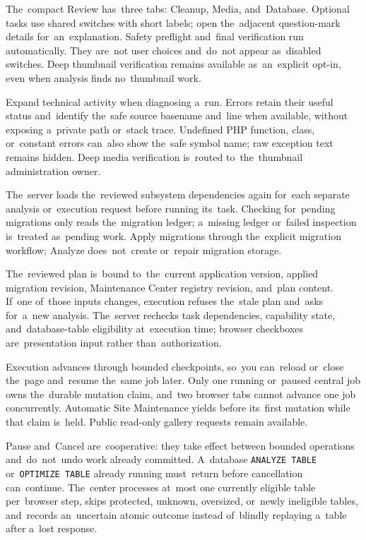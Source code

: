 \documentclass[11pt,a4paper]{article}
\newcommand{\codeword}[1]{\nolinkurl{#1}}
\begin{document}
The~compact Review has~three tabs: Cleanup, Media, and~Database. Optional tasks
use shared switches with short labels; open the~adjacent question-mark details
for~an~explanation. Safety preflight and~final verification run automatically.
They are~not user choices and~do~not appear as~disabled switches. Deep
thumbnail verification remains available as~an~explicit opt-in, even when
analysis finds no~thumbnail work.

Expand technical activity when diagnosing a~run. Errors retain their useful
status and~identify the~safe source basename and~line when available, without
exposing a~private path or~stack trace. Undefined PHP function, class,
or~constant
errors can~also show the~safe symbol name; raw exception text remains hidden.
Deep media verification is~routed to~the~thumbnail administration owner.

The~server loads the~reviewed subsystem dependencies again for~each separate
analysis or~execution request before running its~task. Checking for~pending
migrations only reads the~migration ledger; a~missing ledger or~failed
inspection is~treated as~pending work. Apply migrations through the~explicit
migration workflow; Analyze does~not~create or~repair migration storage.

The~reviewed plan is~bound to~the~current application version, applied migration
revision, Maintenance Center registry revision, and~plan content. If~one
of~those inputs changes, execution refuses the~stale plan and~asks for~a~new
analysis. The~server rechecks task dependencies, capability state,
and~database-table eligibility at~execution time; browser checkboxes
are~presentation input rather than~authorization.

Execution advances through bounded checkpoints, so~you can~reload or~close
the~page and~resume the~same job later. Only one running or~paused central job
owns the~durable mutation claim, and~two browser tabs cannot advance one job
concurrently. Automatic Site Maintenance yields before its~first mutation while
that claim is~held. Public read-only gallery requests remain available.

Pause and~Cancel are~cooperative: they take effect between bounded operations
and~do~not~undo work already committed. A~database \codeword{ANALYZE TABLE}
or~\codeword{OPTIMIZE TABLE} already running must~return before cancellation
can~continue. The~center processes at~most one currently eligible table
per~browser step, skips protected, unknown, oversized, or~newly ineligible
tables, and~records an~uncertain atomic outcome instead of~blindly replaying
a~table after a~lost response.
\end{document}
